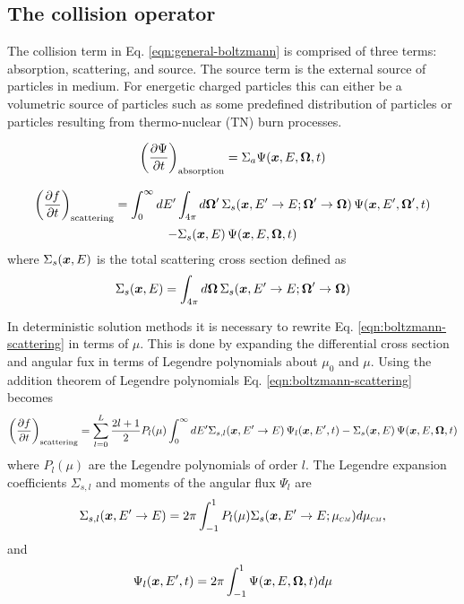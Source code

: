 \subsection{The collision operator}
The collision term in Eq. \eqref{eqn:general-boltzmann} is comprised of three terms: absorption, scattering, and source. The source term is the external source of particles in medium. For energetic charged particles this can either be a volumetric source of particles such as some predefined distribution of particles or particles resulting from thermo-nuclear (TN) burn processes. 

\begin{equation}
  \left( \dfrac{\partial \Psi}{\partial t} \right)_{\text{absorption}} = \Sigma_a \Psi(\boldsymbol{x},E,\boldsymbol{\Omega},t)
\end{equation}

\begin{multline} \label{eqn:boltzmann-scattering}
  \left( \dfrac{\partial f}{\partial t} \right)_{\text{scattering}} = \int_{0}^{\infty} dE^{\prime} \int_{4\pi} d \BOmega^{\prime} \, \Sigma_s(\Bx, E^{\prime}\rightarrow E; \BOmega^{\prime} \rightarrow \BOmega) \, \Psi(\Bx,E^{\prime},\BOmega^{\prime},t) \\
  - \Sigma_s(\Bx,E) \, \Psi(\Bx,E,\BOmega,t)
\end{multline}
where $\Sigma_s(\boldsymbol{x},E)$ is the total scattering cross section defined as
\begin{equation}
  \Sigma_s(\boldsymbol{x},E) = \int_{4\pi} d \boldsymbol{\Omega} \, \Sigma_s(\boldsymbol{x}, E^{\prime}\rightarrow E; \boldsymbol{\Omega}^{\prime} \rightarrow \boldsymbol{\Omega})
\end{equation}

In deterministic solution methods it is necessary to rewrite Eq. \eqref{eqn:boltzmann-scattering} in terms
of $\mu$. This is done by expanding the differential cross section and angular fux in terms of Legendre polynomials about $\mu_0$ and $\mu$. Using the addition theorem of Legendre polynomials Eq. \eqref{eqn:boltzmann-scattering} becomes
\begin{equation}
  \left( \dfrac{\partial f}{\partial t} \right)_{\text{scattering}} = \sum_{l = 0}^L \dfrac{2l+1}{2} P_l(\mu) \int_{0}^{\infty} dE^{\prime} \Sigma_{s,l}(\boldsymbol{x}, E^{\prime}\rightarrow E) \, \Psi_l(\boldsymbol{x},E^{\prime},t) \\
  - \Sigma_s(\boldsymbol{x},E) \, \Psi(\boldsymbol{x},E,\boldsymbol{\Omega},t)
\end{equation}
where $P_l(\mu)$ are the Legendre polynomials of order $l$. The Legendre expansion coefficients $\Sigma_{s,l}$ and moments of the angular flux $\Psi_l$ are
\begin{equation}
  \Sigma_{s,l}(\Bx, E^{\prime}\rightarrow E) = 2 \pi \int_{-1}^{1} P_l(\mu) \Sigma_s(\Bx, E^{\prime}\rightarrow E; \mucm) d\mucm,
\end{equation}
and
\begin{equation}
  \Psi_l(\boldsymbol{x},E^{\prime},t) = 2\pi \int_{-1}^{1} \Psi(\boldsymbol{x},E,\boldsymbol{\Omega},t) d\mu
\end{equation}

